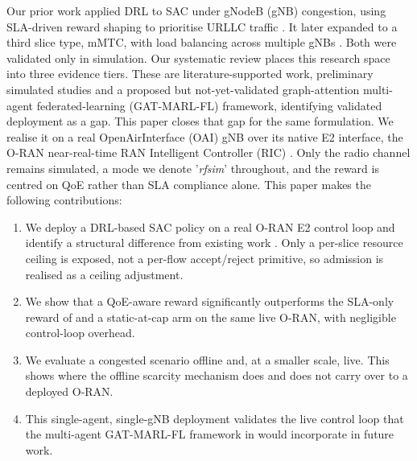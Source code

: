 \documentclass[10pt]{article}
\begin{document}
Our prior work applied DRL to SAC under gNodeB (gNB) congestion, using
SLA-driven reward shaping to prioritise URLLC traffic
\cite{mecon-paper1}. It later expanded to a third slice type, mMTC,
with load balancing across multiple gNBs \cite{icraie-paper2}. Both
were validated only in simulation. Our systematic review
\cite{survey-paper3} places this research space into three evidence
tiers. These are literature-supported work, preliminary simulated
studies and a proposed but not-yet-validated graph-attention
multi-agent federated-learning (GAT-MARL-FL) framework, identifying validated deployment as a gap.
This paper closes that gap for the same formulation. We realise it on
a real OpenAirInterface (OAI) gNB over its native E2 interface, the
O-RAN near-real-time RAN Intelligent Controller (RIC)
\cite{oran-e2ap}. Only the radio channel remains simulated, a mode we
denote '\textit{rfsim}' throughout, and the reward is centred on QoE rather than
SLA compliance alone. This paper makes the following
contributions:
\begin{enumerate}[itemsep=1pt,topsep=2pt,parsep=0pt,partopsep=0pt]
\item We deploy a DRL-based SAC policy on a real O-RAN E2 control
loop and identify a structural difference from existing work
\cite{mecon-paper1,icraie-paper2}. Only a per-slice resource ceiling
is exposed, not a per-flow accept/reject primitive, so admission is
realised as a ceiling adjustment.
\item We show that a QoE-aware reward significantly outperforms the
SLA-only reward of \cite{mecon-paper1,icraie-paper2} and a
static-at-cap arm on the same live O-RAN, with negligible
control-loop overhead.
\item We evaluate a congested scenario offline and, at a smaller
scale, live. This shows where the offline scarcity mechanism does
and does not carry over to a deployed O-RAN.
\item This single-agent, single-gNB deployment validates the live
control loop that the multi-agent GAT-MARL-FL framework in
\cite{survey-paper3} would incorporate in future work.
\end{enumerate}
\end{document}
